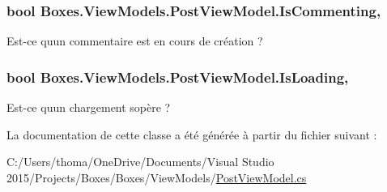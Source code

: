 \subsubsection[{\texorpdfstring{Is\+Commenting}{IsCommenting}}]{\setlength{\rightskip}{0pt plus 5cm}bool Boxes.\+View\+Models.\+Post\+View\+Model.\+Is\+Commenting\hspace{0.3cm}{\ttfamily [get]}, {\ttfamily [set]}}\hypertarget{class_boxes_1_1_view_models_1_1_post_view_model_ac67d855603160541cad73f0969374e34}{}\label{class_boxes_1_1_view_models_1_1_post_view_model_ac67d855603160541cad73f0969374e34}


Est-\/ce qu\textquotesingle{}un commentaire est en cours de création ? 

\subsubsection[{\texorpdfstring{Is\+Loading}{IsLoading}}]{\setlength{\rightskip}{0pt plus 5cm}bool Boxes.\+View\+Models.\+Post\+View\+Model.\+Is\+Loading\hspace{0.3cm}{\ttfamily [get]}, {\ttfamily [set]}}\hypertarget{class_boxes_1_1_view_models_1_1_post_view_model_a3c98327f7674f9f8cce196006962d775}{}\label{class_boxes_1_1_view_models_1_1_post_view_model_a3c98327f7674f9f8cce196006962d775}


Est-\/ce qu\textquotesingle{}un chargement s\textquotesingle{}opère ? 



La documentation de cette classe a été générée à partir du fichier suivant \+:\begin{DoxyCompactItemize}
\item 
C\+:/\+Users/thoma/\+One\+Drive/\+Documents/\+Visual Studio 2015/\+Projects/\+Boxes/\+Boxes/\+View\+Models/\hyperlink{_post_view_model_8cs}{Post\+View\+Model.\+cs}\end{DoxyCompactItemize}
